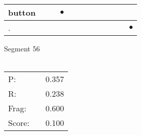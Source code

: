 \documentclass[landscape]{article}
\newcommand{\ssp}{\hspace{2pt}}
\newcommand{\mex}{\cellcolor{g}$\bullet$}
\begin{document}
\begin{tabular}{|l|p{10pt}|p{10pt}|p{10pt}|p{10pt}|p{10pt}|p{10pt}|p{10pt}|p{10pt}|p{10pt}|p{10pt}|p{10pt}|}
\hline
\ssp \cellcolor{ref2}button \ssp&\hspace{2pt}&\hspace{2pt}&\hspace{2pt}\mex&\hspace{2pt}&\hspace{2pt}&\hspace{2pt}&\hspace{2pt}&\hspace{2pt}&\hspace{2pt}&\hspace{2pt}&\hspace{2pt}\\
\hline
\ssp \cellcolor{ref10}. \ssp&\hspace{2pt}&\hspace{2pt}&\hspace{2pt}&\hspace{2pt}&\hspace{2pt}&\hspace{2pt}&\hspace{2pt}&\hspace{2pt}&\hspace{2pt}&\hspace{2pt}&\hspace{2pt}\mex\\
\hline
\end{tabular}

\vspace{6pt}
\noindent Segment 56\\\\
\noindent\begin{tabular}{lm{12pt}r}
\hline
P:&&0.357\\
R:&&0.238\\
Frag:&&0.600\\
Score:&&0.100\\
\end{tabular}

\newpage
\end{document}

